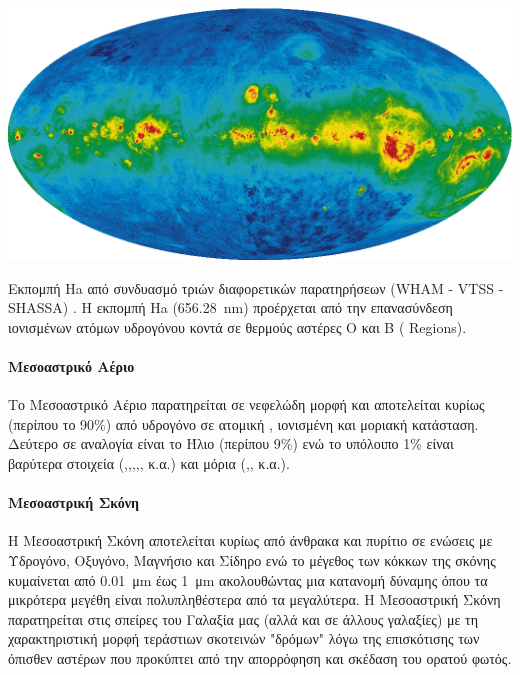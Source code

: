 \documentclass[article,a4paper,11.2pt]{memoir}
\numberwithin{equation}{subsection}
\begin{document}
\begin{marginfigure}
	\label{fig:Ha}
	\centering
	\includegraphics[width=1\linewidth]{Images/Ha.png}
	\caption{Εκπομπή Ha από συνδυασμό τριών διαφορετικών παρατηρήσεων (WHAM - VTSS - SHASSA) \cite{finkbeiner_2003}. Η εκπομπή Ha (\SI{656.28}{nm}) προέρχεται από την επανασύνδεση ιονισμένων ατόμων υδρογόνου κοντά σε θερμούς αστέρες O και B ( Regions).}
\end{marginfigure}


\paragraph{Μεσοαστρικό Αέριο} 
Το Μεσοαστρικό Αέριο παρατηρείται σε νεφελώδη μορφή και αποτελείται κυρίως (περίπου το 90\%) από υδρογόνο σε ατομική , ιονισμένη  και μοριακή  κατάσταση. Δεύτερο σε αναλογία είναι το Ήλιο  (περίπου 9\%) ενώ το υπόλοιπο 1\% είναι βαρύτερα στοιχεία (,,,,, κ.α.) και μόρια (,, κ.α.).


\paragraph{Μεσοαστρική Σκόνη}

Η Μεσοαστρική Σκόνη αποτελείται κυρίως από άνθρακα και πυρίτιο σε ενώσεις με Υδρογόνο, Οξυγόνο, Μαγνήσιο και Σίδηρο ενώ το μέγεθος των κόκκων της σκόνης κυμαίνεται από \SI{0.01}{\micro\meter} έως \SI{1}{\micro\meter} ακολουθώντας μια κατανομή δύναμης όπου τα μικρότερα μεγέθη είναι πολυπληθέστερα από τα μεγαλύτερα. 
Η Μεσοαστρική Σκόνη παρατηρείται στις σπείρες του Γαλαξία μας (αλλά και σε άλλους γαλαξίες) με τη χαρακτηριστική μορφή τεράστιων σκοτεινών "δρόμων" λόγω της επισκότισης των όπισθεν αστέρων που προκύπτει από την απορρόφηση και σκέδαση του ορατού φωτός.
\end{document}
